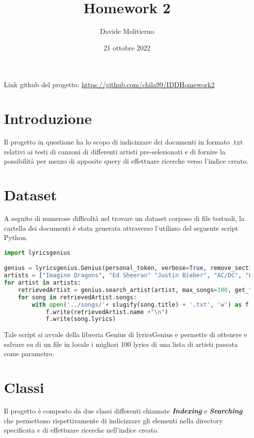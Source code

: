 \documentclass[12pt, letterpaper]{article}
\title{Homework 2}
\author{Davide Molitierno}
\date{21 ottobre 2022}
\begin{document}
\maketitle
Link github del progetto: \url{https://github.com/chila99/IDDHomework2}
\section{Introduzione}
Il progetto in questione ha lo scopo di indicizzare dei documenti in formato .txt relativi ai testi di canzoni di differenti artisti pre-selezionati e di fornire la possibilità per mezzo di apposite query di effettuare ricerche verso l'indice creato.

\section{Dataset}
A seguito di numerose difficoltà nel trovare un dataset corposo di file testuali, la cartella dei documenti è stata generata attraverso l'utilizzo del seguente script Python.
\begin{lstlisting}[language=Python]
import lyricsgenius

genius = lyricsgenius.Genius(personal_token, verbose=True, remove_section_headers=True, skip_non_songs=True, retries=5, timeout=120)
artists = ["Imagine Dragons", "Ed Sheeran" "Justin Bieber", "AC/DC", "Bad Bunny", "Beyonce", "Tiziano Ferro"]
for artist in artists:
    retrievedArtist = genius.search_artist(artist, max_songs=100, get_full_info=False)
    for song in retrievedArtist.songs:
        with open('../songs/'+ slugify(song.title) + '.txt', 'w') as f:
            f.write(retrievedArtist.name +"\n")
            f.write(song.lyrics)
\end{lstlisting}
Tale script si avvale della libreria Genius di lyricsGenius e permette di ottenere e salvare su di un file in locale i migliori 100 lyrics di una lista di artisti passata come parametro.
\section{Classi}
Il progetto è composto da due classi differenti chiamate \textbf{\emph{Indexing}} e \textbf{\emph{Searching}} che permettono rispettivamente di indicizzare gli elementi nella directory specificata e di effettuare ricerche nell'indice creato.
\end{document}
